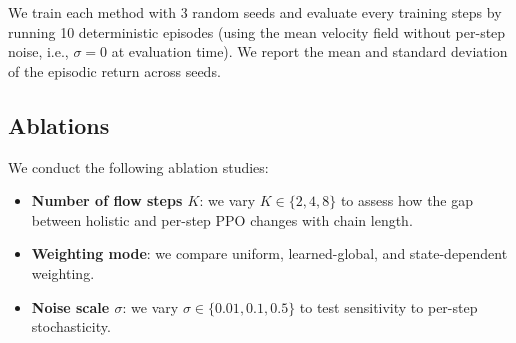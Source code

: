 We train each method with 3 random seeds and evaluate every  training
steps by running 10 deterministic episodes (using the mean velocity field
without per-step noise, i.e., $\sigma{=}0$ at evaluation time).  We report the
mean and standard deviation of the episodic return across seeds.

\subsection{Ablations}
\label{sec:experiments:ablations}

We conduct the following ablation studies:
\begin{itemize}[nosep,leftmargin=*]
  \item \textbf{Number of flow steps $K$}: we vary $K \in \{2, 4, 8\}$ to
        assess how the gap between holistic and per-step PPO changes with chain
        length.
  \item \textbf{Weighting mode}: we compare uniform, learned-global, and
        state-dependent weighting.
  \item \textbf{Noise scale $\sigma$}: we vary
        $\sigma \in \{0.01, 0.1, 0.5\}$ to test sensitivity to per-step
        stochasticity.
\end{itemize}
